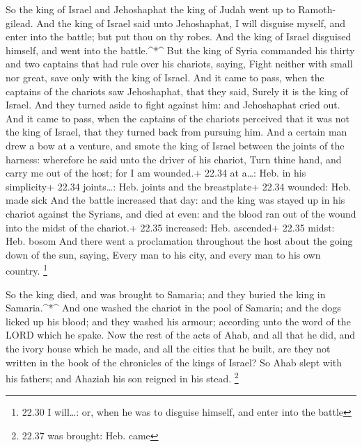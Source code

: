  So the king of Israel and Jehoshaphat the king of Judah
went up to Ramoth-gilead.  And the king of Israel said unto
Jehoshaphat, I will disguise myself, and enter into the battle; but put
thou on thy robes. And the king of Israel disguised himself, and went
into the battle.\^{}*\^{}  But the king of Syria commanded
his thirty and two captains that had rule over his chariots, saying,
Fight neither with small nor great, save only with the king of Israel.
 And it came to pass, when the captains of the chariots saw
Jehoshaphat, that they said, Surely it is the king of Israel. And they
turned aside to fight against him: and Jehoshaphat cried out.
 And it came to pass, when the captains of the chariots
perceived that it was not the king of Israel, that they turned back from
pursuing him.  And a certain man drew a bow at a venture,
and smote the king of Israel between the joints of the harness:
wherefore he said unto the driver of his chariot, Turn thine hand, and
carry me out of the host; for I am wounded.+ 22.34 at a\ldots: Heb. in
his simplicity+ 22.34 joints\ldots: Heb. joints and the breastplate+
22.34 wounded: Heb. made sick  And the battle increased
that day: and the king was stayed up in his chariot against the Syrians,
and died at even: and the blood ran out of the wound into the midst of
the chariot.+ 22.35 increased: Heb. ascended+ 22.35 midst: Heb. bosom
 And there went a proclamation throughout the host about
the going down of the sun, saying, Every man to his city, and every man
to his own country. \footnote{22.30 I will\ldots: or, when he was to
  disguise himself, and enter into the battle}

 So the king died, and was brought to Samaria; and they
buried the king in Samaria.\^{}*\^{}  And one washed the
chariot in the pool of Samaria; and the dogs licked up his blood; and
they washed his armour; according unto the word of the LORD which he
spake.  Now the rest of the acts of Ahab, and all that he
did, and the ivory house which he made, and all the cities that he
built, are they not written in the book of the chronicles of the kings
of Israel?  So Ahab slept with his fathers; and Ahaziah his
son reigned in his stead. \footnote{22.37 was brought: Heb. came}

